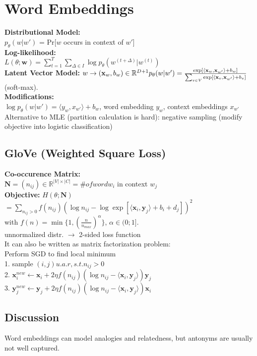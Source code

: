 \section{Word Embeddings}
\textbf{Distributional Model:}\\
$p_\theta(w|w')$ = Pr[$w$ occurs in context of $w'$]\\
\textbf{Log-likelihood:}\\
$L(\theta; \mathbf{w}) = \sum_{t=1}^T\sum_{\Delta \in I}{\log p_\theta(w^{(t+\Delta)}|w^{(t)})}$\\
\textbf{Latent Vector Model:} $w \rightarrow (\mathbf{x}_w, b_w) \in \mathbb{R}^{D+1} \\p_{\theta}(w|w') = \frac{\exp[\langle \mathbf{x}_w,\mathbf{x}_{w'}\rangle + b_w]}{\sum_{v\in V}{\exp[\langle \mathbf{x}_v,\mathbf{x}_{w'}\rangle + b_v ]}}$ (soft-max).\\
\textbf{Modifications:}\\
$\log p_{\theta}(w|w') = \langle  y_{w} , x_{w'} \rangle + b_w$,  word embedding $y_w$, context embeddings $x_{w'}$\\
Alternative to MLE (partition calculation is hard): negative sampling (modify objective into logistic classification)
\vspace{10mm}

\subsection*{GloVe (Weighted Square Loss)}
\textbf{Co-occurence Matrix:}\\
$\mathbf{N} = (n_{ij}) \in \mathbb{R}^{|V|\times|C|} = \# of word w_i$ in context $w_j$\\
\textbf{Objective:} $H(\theta;\mathbf{N})$\\
$= \sum_{n_{ij} > 0} f(n_{ij})(\log n_{ij} - \log \exp[\langle \mathbf{x}_i, \mathbf{y}_j \rangle + b_i + d_j])^2$\\
with $f(n) = \min\{1, (\frac{n}{n_{max}})^\alpha\}$, $\alpha \in (0;1]$.\\
unnormalized distr. $\rightarrow$ 2-sided loss function\\
It can also be written as matrix factorization problem: 
\vspace{10mm}\\
Perform SGD to find local minimum\\
1. sample $(i,j) u.a.r, s.t. n_{ij}>0$\\
2. $\mathbf{x}_i^{new} \leftarrow \mathbf{x}_i + 2\eta f(n_{ij})(\log n_{ij} - \langle \mathbf{x}_i, \mathbf{y}_j \rangle)\mathbf{y}_j$\\
3. $\mathbf{y}_j^{new} \leftarrow \mathbf{y}_j + 2\eta f(n_{ij})(\log n_{ij} - \langle \mathbf{x}_i, \mathbf{y}_j \rangle)\mathbf{x}_i$

\subsection*{Discussion}
Word embeddings can model analogies and relatedness, but antonyms are usually not well captured.

